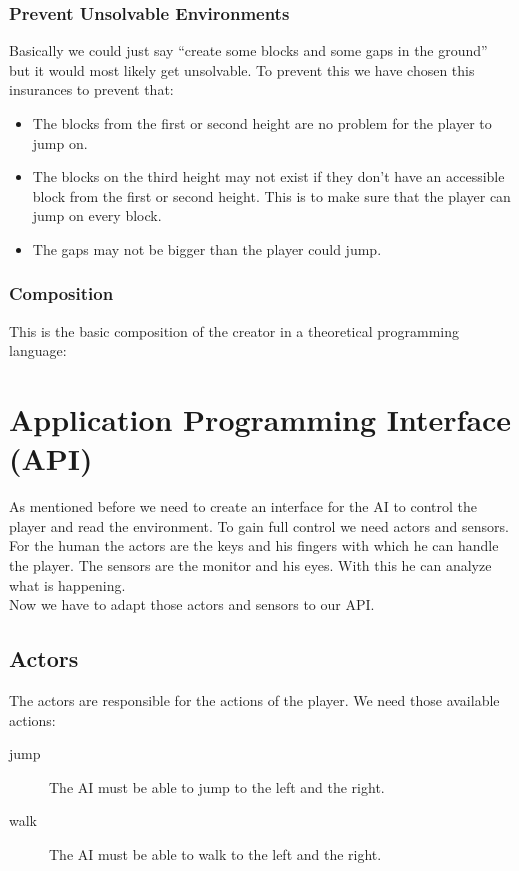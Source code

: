 \subsubsection{Prevent Unsolvable Environments}
Basically we could just say ``create some blocks and some gaps in the ground'' but it would most likely get unsolvable. To prevent this we have chosen this insurances to prevent that:
\begin{itemize}
  \item The blocks from the first or second height are no problem for the player to jump on.
  \item The blocks on the third height may not exist if they don't have an accessible block from the first or second height. This is to make sure that the player can jump on every block.
  \item The gaps may not be bigger than the player could jump. 
\end{itemize}

\subsubsection{Composition}
This is the basic composition of the creator in a theoretical programming language:


\newpage
\section{Application Programming Interface (API)}
As mentioned before we need to create an interface for the AI to control the player and read the environment. To gain full control we need actors and sensors.\medskip\\
For the human the actors are the keys and his fingers with which he can handle the player. The sensors are the monitor and his eyes. With this he can analyze what is happening.\medskip\\
Now we have to adapt those actors and sensors to our API.
\subsection{Actors}
The actors are responsible for the actions of the player. We need those available actions:
\begin{description}
  \item[jump] The AI must be able to jump to the left and the right.
  \item[walk] The AI must be able to walk to the left and the right.
\end{description}

